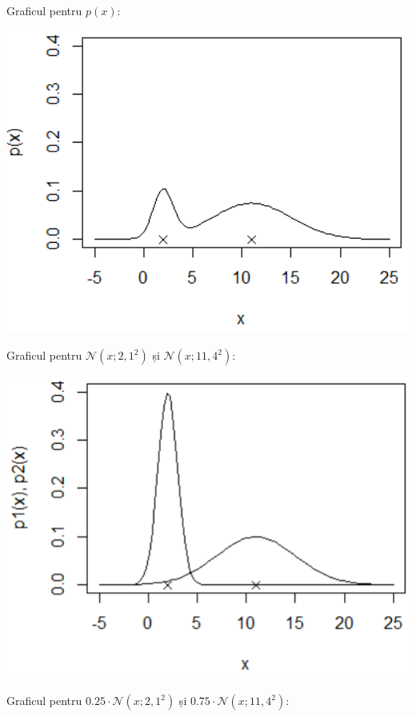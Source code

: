 \documentclass[12pt]{article}
\begin{document}
	Graficul pentru $p(x)$:
	\begin{center}
		\includegraphics{screenshot002}
	\end{center}
	\newpage
	Graficul pentru $\mathcal{N}(x;2,1^2)$ și $\mathcal{N}(x;11,4^2)$:
	\begin{center}
		\includegraphics{screenshot003}
	\end{center}
	Graficul pentru $0.25 \cdot \mathcal{N}(x;2,1^2)$ și $0.75 \cdot \mathcal{N}(x;11,4^2)$:
\end{document}
